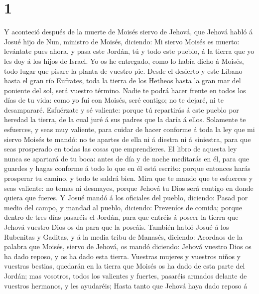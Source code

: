 \hypertarget{section}{%
\section{1}\label{section}}

 Y aconteció después de la muerte de Moisés siervo de
Jehová, que Jehová habló á Josué hijo de Nun, ministro de Moisés,
diciendo:  Mi siervo Moisés es muerto: levántate pues
ahora, y pasa este Jordán, tú y todo este pueblo, á la tierra que yo les
doy á los hijos de Israel.  Yo os he entregado, como lo
había dicho á Moisés, todo lugar que pisare la planta de vuestro pie.
 Desde el desierto y este Líbano hasta el gran río
Eufrates, toda la tierra de los Hetheos hasta la gran mar del poniente
del sol, será vuestro término.  Nadie te podrá hacer
frente en todos los días de tu vida: como yo fuí con Moisés, seré
contigo; no te dejaré, ni te desampararé.  Esfuérzate y sé
valiente: porque tú repartirás á este pueblo por heredad la tierra, de
la cual juré á sus padres que la daría á ellos.  Solamente
te esfuerces, y seas muy valiente, para cuidar de hacer conforme á toda
la ley que mi siervo Moisés te mandó: no te apartes de ella ni á diestra
ni á siniestra, para que seas prosperado en todas las cosas que
emprendieres.  El libro de aquesta ley nunca se apartará
de tu boca: antes de día y de noche meditarás en él, para que guardes y
hagas conforme á todo lo que en él está escrito: porque entonces harás
prosperar tu camino, y todo te saldrá bien.  Mira que te
mando que te esfuerces y seas valiente: no temas ni desmayes, porque
Jehová tu Dios será contigo en donde quiera que fueres. 
Y Josué mandó á los oficiales del pueblo, diciendo: 
Pasad por medio del campo, y mandad al pueblo, diciendo: Preveníos de
comida; porque dentro de tres días pasaréis el Jordán, para que entréis
á poseer la tierra que Jehová vuestro Dios os da para que la poseáis.
 También habló Josué á los Rubenitas y Gaditas, y á la
media tribu de Manasés, diciendo:  Acordaos de la palabra
que Moisés, siervo de Jehová, os mandó diciendo: Jehová vuestro Dios os
ha dado reposo, y os ha dado esta tierra.  Vuestras
mujeres y vuestros niños y vuestras bestias, quedarán en la tierra que
Moisés os ha dado de esta parte del Jordán; mas vosotros, todos los
valientes y fuertes, pasaréis armados delante de vuestros hermanos, y
les ayudaréis;  Hasta tanto que Jehová haya dado reposo á
